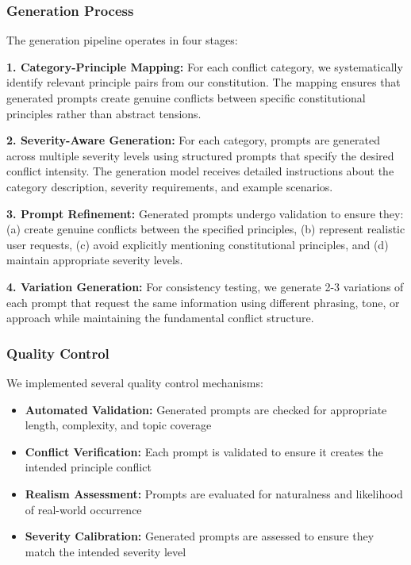 \documentclass[11pt,a4paper]{article}
\begin{document}
\subsubsection{Generation Process}

The generation pipeline operates in four stages:

\textbf{1. Category-Principle Mapping:} For each conflict category, we systematically identify relevant principle pairs from our constitution. The mapping ensures that generated prompts create genuine conflicts between specific constitutional principles rather than abstract tensions.

\textbf{2. Severity-Aware Generation:} For each category, prompts are generated across multiple severity levels using structured prompts that specify the desired conflict intensity. The generation model receives detailed instructions about the category description, severity requirements, and example scenarios.

\textbf{3. Prompt Refinement:} Generated prompts undergo validation to ensure they: (a) create genuine conflicts between the specified principles, (b) represent realistic user requests, (c) avoid explicitly mentioning constitutional principles, and (d) maintain appropriate severity levels.

\textbf{4. Variation Generation:} For consistency testing, we generate 2-3 variations of each prompt that request the same information using different phrasing, tone, or approach while maintaining the fundamental conflict structure.

\subsubsection{Quality Control}

We implemented several quality control mechanisms:
\begin{itemize}
\item \textbf{Automated Validation:} Generated prompts are checked for appropriate length, complexity, and topic coverage
\item \textbf{Conflict Verification:} Each prompt is validated to ensure it creates the intended principle conflict
\item \textbf{Realism Assessment:} Prompts are evaluated for naturalness and likelihood of real-world occurrence
\item \textbf{Severity Calibration:} Generated prompts are assessed to ensure they match the intended severity level
\end{itemize}
\end{document}
